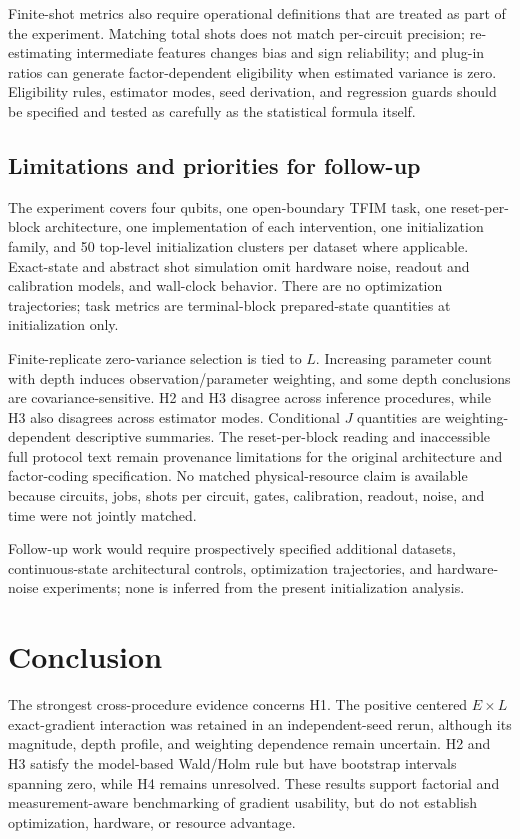 \documentclass[pdflatex,sn-basic,Numbered]{sn-jnl}
\begin{document}
Finite-shot metrics also require operational definitions that are treated as part of the experiment. Matching total shots does not match per-circuit precision; re-estimating intermediate features changes bias and sign reliability; and plug-in ratios can generate factor-dependent eligibility when estimated variance is zero. Eligibility rules, estimator modes, seed derivation, and regression guards should be specified and tested as carefully as the statistical formula itself.

\subsection{Limitations and priorities for follow-up}\label{sec:limitations}

The experiment covers four qubits, one open-boundary TFIM task, one reset-per-block architecture, one implementation of each intervention, one initialization family, and 50 top-level initialization clusters per dataset where applicable. Exact-state and abstract shot simulation omit hardware noise, readout and calibration models, and wall-clock behavior. There are no optimization trajectories; task metrics are terminal-block prepared-state quantities at initialization only.

Finite-replicate zero-variance selection is tied to $L$. Increasing parameter count with depth induces observation/parameter weighting, and some depth conclusions are covariance-sensitive. H2 and H3 disagree across inference procedures, while H3 also disagrees across estimator modes. Conditional $J$ quantities are weighting-dependent descriptive summaries. The reset-per-block reading and inaccessible full protocol text remain provenance limitations for the original architecture and factor-coding specification. No matched physical-resource claim is available because circuits, jobs, shots per circuit, gates, calibration, readout, noise, and time were not jointly matched.

Follow-up work would require prospectively specified additional datasets, continuous-state architectural controls, optimization trajectories, and hardware-noise experiments; none is inferred from the present initialization analysis.

\section{Conclusion}\label{sec:conclusion}

The strongest cross-procedure evidence concerns H1. The positive centered $E\times L$ exact-gradient interaction was retained in an independent-seed rerun, although its magnitude, depth profile, and weighting dependence remain uncertain. H2 and H3 satisfy the model-based Wald/Holm rule but have bootstrap intervals spanning zero, while H4 remains unresolved. These results support factorial and measurement-aware benchmarking of gradient usability, but do not establish optimization, hardware, or resource advantage.
\end{document}
